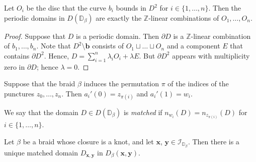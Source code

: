 \documentclass[11pt]{amsart}
\numberwithin{equation}{section}
\numberwithin{figure}{section}
\theoremstyle{definition}
\newcommand{\cI}{\mathcal{I}}
\newcommand{\bD}{\mathbb{D}}
\newcommand{\bZ}{\mathbb{Z}}
\newcommand{\bb}{\boldsymbol{b}}
\newcommand{\xs}{\boldsymbol{x}}
\newcommand{\ys}{\boldsymbol{y}}
\begin{document}
\begin{lem}\label{lem:periodic}
    Let $O_i$ be the disc that the curve $b_i$ bounds in $D^2$ for $i \in \{1,\dots,n\}$. Then the periodic domains in $D(\bD_\beta)$ are exactly the $\bZ$-linear combinations of $O_1,\dots,O_n$.  
\end{lem}

\begin{proof}
    Suppose that $D$ is a periodic domain. Then $\partial D$ is a $\bZ$-linear combination of $b_1,\dots,b_n$. Note that $D^2 \setminus \bb$ consists of $O_1 \sqcup \dots \sqcup O_n$ and a component $E$ that contains $\partial D^2$. Hence, $D = \sum_{i=1}^n \lambda_i O_i + \lambda E$. But $\partial D^2$ appears with multiplicity zero in $\partial D$; hence $\lambda = 0$.
\end{proof}

Suppose that the braid $\beta$ induces the permutation $\pi$ of the indices of the punctures $z_0,\dots,z_n$. Then $a_i'(0) = z_{\pi(i)}$ and $a_i'(1) = w_i$.

\begin{defn}
    We say that the domain $D \in D(\bD_\beta)$ is \emph{matched} if $n_{w_i}(D) = n_{z_{\pi(i)}}(D)$ for $i \in \{1,\dots,n\}$.
\end{defn}

\begin{prop}\label{prop:matched}
    Let $\beta$ be a braid whose closure is a knot, and let $\xs$, $\ys \in \cI_{\bD_\beta}$. Then there is a unique matched domain $D_{\xs,\ys}$ in $D_{\beta}(\xs,\ys)$.
\end{prop}
\end{document}
